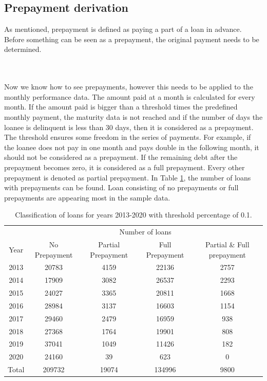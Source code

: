 \subsection{Prepayment derivation}
    As mentioned, prepayment is defined as paying a part of a loan in advance. Before something can be seen as a prepayment, the original payment needs to be determined.
    
    \\\\
    Now we know how to see prepayments, however this needs to be applied to the monthly performance data. The amount paid at a month is calculated for every month. If the amount paid is bigger than a threshold times the predefined monthly payment, the maturity data is not reached and if the number of days the loanee is delinquent is less than 30 days, then it is considered as a prepayment. The threshold ensures some freedom in the series of payments. For example, if the loanee does not pay in one month and pays double in the following month, it should not be considered as a prepayment. If the remaining debt after the prepayment becomes zero, it is considered as a full prepayment. Every other prepayment is denoted as partial prepayment. In Table \ref{model_classficationprepayment_table}, the number of loans with prepayments can be found. Loan consisting of no prepayments or full prepayments are appearing most in the sample data. 
    \begin{table}[H]
    \centering
    \begin{tabular}{c|c|c|c|c}
        & \multicolumn{4}{c}{Number of loans} \\
        Year&No Prepayment&Partial Prepayment&Full Prepayment&Partial \& Full prepayment  \\\hline
        2013 & 20783 & 4159 & 22136 & 2757\\
        2014 & 17909 & 3082 & 26537 & 2293\\
        2015 & 24027 & 3365 & 20811 & 1668 \\
        2016 & 28984 & 3137 & 16603 & 1154 \\
        2017 & 29460 & 2479 & 16959 & 938 \\
        2018 & 27368 & 1764 & 19901 & 808 \\
        2019 & 37041 & 1049 & 11426 & 182 \\
        2020 & 24160 & 39 & 623 & 0 \\
        Total & 209732 & 19074 & 134996 & 9800
		\end{tabular}
		\caption{Classification of loans for years 2013-2020 with threshold percentage of 0.1.}
		\label{model_classficationprepayment_table}
    \end{table}

